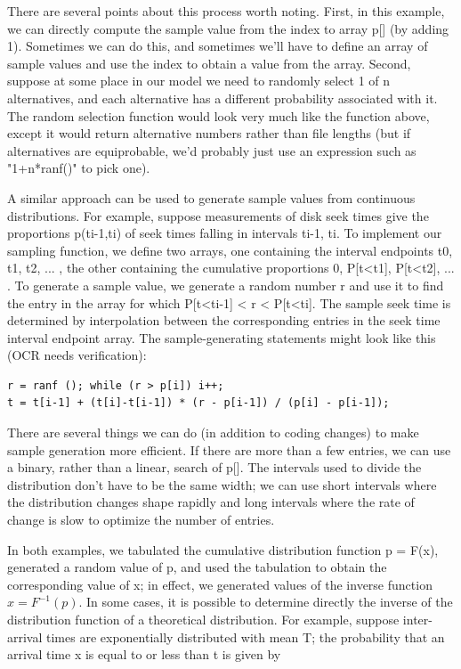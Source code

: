 There are several points about this process worth noting. First, in this
example, we can directly compute the sample value from the index to array p[]
(by adding 1). Sometimes we can do this, and sometimes we'll have to define an
array of sample values and use the index to obtain a value from the array.
Second, suppose at some place in our model we need to randomly select 1 of n
alternatives, and each alternative has a different probability associated with
it. The random selection function would look very much like the function above,
except it would return alternative numbers rather than file lengths (but if
alternatives are equiprobable, we'd probably just use an expression such as
"1+n*ranf()" to pick one).

A similar approach can be used to generate sample values from continuous
distributions. For example, suppose measurements of disk seek times give the
proportions p(ti-1,ti) of seek times falling in intervals ti-1, ti. To implement
our sampling function, we define two arrays, one containing the interval
endpoints t0, t1, t2, ... , the other containing the cumulative proportions 0,
P[t<t1], P[t<t2], ... . To generate a sample value, we generate a random number
r and use it to find the entry in the array for which P[t<ti-1] < r < P[t<ti].
The sample seek time is determined by interpolation between the corresponding
entries in the seek time interval endpoint array. The sample-generating
statements might look like this (OCR needs verification):

\begin{verbatim}
r = ranf (); while (r > p[i]) i++;
t = t[i-1] + (t[i]-t[i-1]) * (r - p[i-1]) / (p[i] - p[i-1]);
\end{verbatim}

There are several things we can do (in addition to coding changes) to make
sample generation more efficient. If there are more than a few entries, we can
use a binary, rather than a linear, search of p[]. The intervals used to divide
the distribution don't have to be the same width; we can use short intervals
where the distribution changes shape rapidly and long intervals where the rate
of change is slow to optimize the number of entries.

In both examples, we tabulated the cumulative distribution function p = F(x),
generated a random value of p, and used the tabulation to obtain the
corresponding value of x; in effect, we generated values of the inverse
function \ensuremath{x = F^{-1}(p)}. In some cases, it is possible to determine directly the
inverse of the distribution function of a theoretical distribution. For
example, suppose inter-arrival times are exponentially distributed with mean T;
the probability that an arrival time x is equal to or less than t is given by

